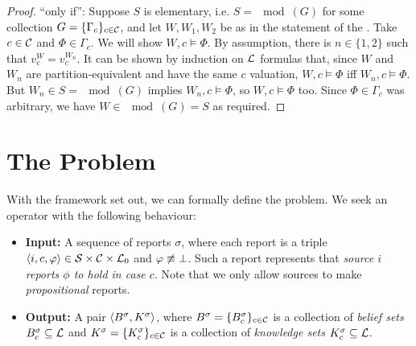 \begin{proof}
    ``only if'': Suppose $S$ is elementary, i.e. $S = \mod(G)$ for some
    collection $G = \{\Gamma_c\}_{c \in \mathcal{C}}$, and let $W, W_1, W_2$ be as in
    the statement of the . Take $c
    \in \mathcal{C}$ and $\Phi \in \Gamma_c$. We will show $W, c \models \Phi$. By assumption,
    there is $n \in \{1, 2\}$ such that $v^W_c = v^{W_n}_c$. It can be shown by
    induction on $\mathcal{L}{}$ formulas that, since $W$ and $W_n$ are
    partition-equivalent and have the same $c$ valuation, $W, c \models \Phi$ iff
    $W_n, c \models \Phi$. But $W_n \in S = \mod(G)$ implies $W_n, c \models
    \Phi$,
    so $W, c \models \Phi$ too.  Since $\Phi \in \Gamma_c$ was arbitrary, we have $W
    \in \mod(G) = S$ as required.
\end{proof}

\section{The Problem}
\label{kr_sec_the_problem}

With the framework set out, we can formally define the problem. We
seek an operator with the following behaviour:

\begin{itemize}

\item \textbf{Input:} A sequence of reports $\sigma$, where each report is a
      triple $\langle {i, c, \varphi} \rangle \in \mathcal{S} \times \mathcal{C} \times \mathcal{L}{}_0$ and $\varphi
      \not\equiv \bot$. Such a report represents that {\em source $i$
      reports $\phi$ to hold in case $c$}. Note that we only allow sources to
      make \emph{propositional} reports.

\item \textbf{Output:} A pair $\langle {B^\sigma, K^\sigma} \rangle$, where $B^\sigma =
      \{B^\sigma_c\}_{c \in \mathcal{C}}$ is a collection of \emph{belief sets}
      $B^\sigma_c \subseteq \mathcal{L}{}$ and $K^\sigma = \{K^\sigma_c\}_{c \in \mathcal{C}}$
      is a collection of \emph{knowledge sets} $K^\sigma_c \subseteq \mathcal{L}{}$.

\end{itemize}


